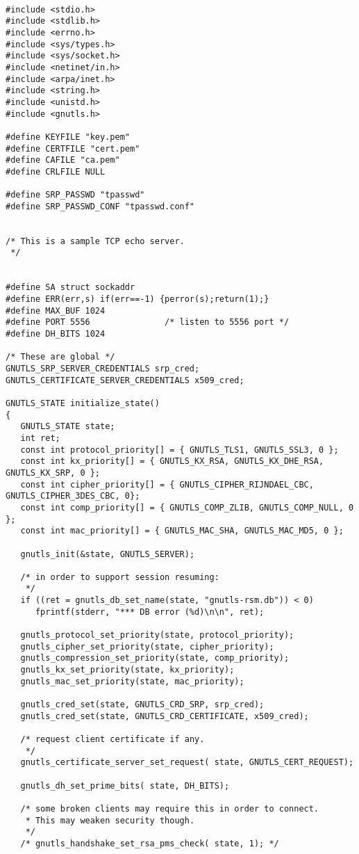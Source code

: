 \begin{verbatim}

#include <stdio.h>
#include <stdlib.h>
#include <errno.h>
#include <sys/types.h>
#include <sys/socket.h>
#include <netinet/in.h>
#include <arpa/inet.h>
#include <string.h>
#include <unistd.h>
#include <gnutls.h>

#define KEYFILE "key.pem"
#define CERTFILE "cert.pem"
#define CAFILE "ca.pem"
#define CRLFILE NULL

#define SRP_PASSWD "tpasswd"
#define SRP_PASSWD_CONF "tpasswd.conf"


/* This is a sample TCP echo server.
 */


#define SA struct sockaddr
#define ERR(err,s) if(err==-1) {perror(s);return(1);}
#define MAX_BUF 1024
#define PORT 5556               /* listen to 5556 port */
#define DH_BITS 1024

/* These are global */
GNUTLS_SRP_SERVER_CREDENTIALS srp_cred;
GNUTLS_CERTIFICATE_SERVER_CREDENTIALS x509_cred;

GNUTLS_STATE initialize_state()
{
   GNUTLS_STATE state;
   int ret;
   const int protocol_priority[] = { GNUTLS_TLS1, GNUTLS_SSL3, 0 };
   const int kx_priority[] = { GNUTLS_KX_RSA, GNUTLS_KX_DHE_RSA, GNUTLS_KX_SRP, 0 };
   const int cipher_priority[] = { GNUTLS_CIPHER_RIJNDAEL_CBC, GNUTLS_CIPHER_3DES_CBC, 0};
   const int comp_priority[] = { GNUTLS_COMP_ZLIB, GNUTLS_COMP_NULL, 0 };
   const int mac_priority[] = { GNUTLS_MAC_SHA, GNUTLS_MAC_MD5, 0 };

   gnutls_init(&state, GNUTLS_SERVER);

   /* in order to support session resuming:
    */
   if ((ret = gnutls_db_set_name(state, "gnutls-rsm.db")) < 0)
      fprintf(stderr, "*** DB error (%d)\n\n", ret);

   gnutls_protocol_set_priority(state, protocol_priority);
   gnutls_cipher_set_priority(state, cipher_priority);
   gnutls_compression_set_priority(state, comp_priority);
   gnutls_kx_set_priority(state, kx_priority);
   gnutls_mac_set_priority(state, mac_priority);

   gnutls_cred_set(state, GNUTLS_CRD_SRP, srp_cred);
   gnutls_cred_set(state, GNUTLS_CRD_CERTIFICATE, x509_cred);

   /* request client certificate if any.
    */
   gnutls_certificate_server_set_request( state, GNUTLS_CERT_REQUEST);

   gnutls_dh_set_prime_bits( state, DH_BITS);

   /* some broken clients may require this in order to connect. 
    * This may weaken security though.
    */
   /* gnutls_handshake_set_rsa_pms_check( state, 1); */


\end{verbatim}
